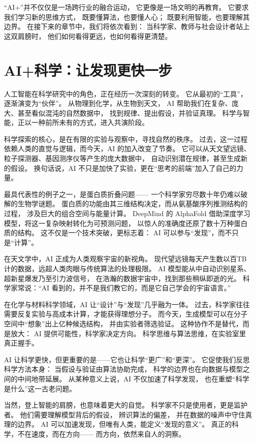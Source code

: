 “AI+”并不仅仅是一场跨行业的融合运动，  
它更像是一场文明的再教育。  
它要求我们学习新的思维方式，  
既要懂算法，也要懂人心；  
既要利用智能，也要理解其边界。  
在接下来的章节中，我们将依次看到：  
当科学家、教师与社会设计者站上这双肩膀时，  
他们如何看得更远，也如何看得更清楚。

\section{AI+科学：让发现更快一步}

人工智能在科学研究中的角色，正在经历一次深刻的转变。  
它从最初的“工具”，逐渐演变为“伙伴”。  
从物理到化学，从生物到天文，  
AI 帮助我们在复杂、庞大、甚至看似混沌的自然数据中，  
找到规律、提出假设，并验证真理。  
科学与智能，正以一种前所未有的方式，进入共演阶段。

科学探索的核心，是在有限的实验与观察中，寻找自然的秩序。  
过去，这一过程依赖人类的直觉与逻辑，而今天，AI 的加入改变了节奏。  
它可以从天文望远镜、粒子探测器、基因测序仪等产生的庞大数据中，  
自动识别潜在规律，甚至生成新的假设。  
换句话说，AI 不只是加快了实验，更在“思考的前端”加入了自己的力量。

最具代表性的例子之一，是蛋白质折叠问题——  
一个科学家穷尽数十年仍难以破解的生物学谜题。  
蛋白质的功能由其三维结构决定，而从氨基酸序列推测结构的过程，  
涉及巨大的组合空间与能量计算。  
DeepMind 的 AlphaFold 借助深度学习模型，将这一复杂映射转化为可预测问题，  
以惊人的准确度还原了数十万种蛋白质的结构。  
这不仅是一个技术突破，更标志着：  
AI 可以参与“发现”，而不只是“计算”。

在天文学中，AI 正成为人类观察宇宙的新视角。  
现代望远镜每天产生数以百TB计的数据，远超人类肉眼与传统算法的处理极限。  
AI 模型能从中自动识别星系、超新星爆发乃至引力波信号，  
在浩瀚的数据宇宙中，找到那些稍纵即逝的光。  
科学家常说：“AI 看到的，并不是我们教它的，而是它自己学会的宇宙语言。”

在化学与材料科学领域，AI 让“设计”与“发现”几乎融为一体。  
过去，科学家往往需要反复实验与高成本计算，才能获得理想分子。  
而今天，生成模型可以在分子空间中“想象”出上亿种候选结构，  
并由实验者筛选验证。  
这种协作不是替代，而是放大：  
AI 提供可能性，科学家决定方向。  
科学思维与算法思维，在实验室里真正握手。

AI 让科学更快，但更重要的是——它也让科学“更广”和“更深”。  
它促使我们反思科学方法本身：  
当假设与验证由算法协助完成，  
科学的边界也在向数据与模型之间的中间地带延展。  
从某种意义上说，AI 不仅加速了科学发现，  
也在重塑“科学是什么”这一古老问题。

当然，登上智能的肩膀，也意味着更大的自觉。  
科学家不只是使用者，更是监护者。  
他们需要理解模型背后的假设，  
辨识算法的偏差，  
并在数据的噪声中守住真理的边界。  
AI 可以加速发现，但唯有人类，能定义“发现的意义”。  
真正的科学，不在速度，而在方向——  
而方向，依然来自人的洞察。

